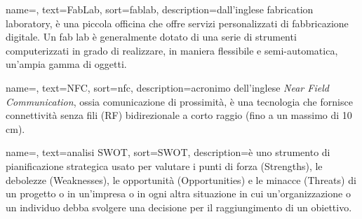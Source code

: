 {
	name=,
    text=FabLab,
    sort=fablab,
    description={dall'inglese fabrication laboratory, è una piccola officina che offre servizi personalizzati di fabbricazione digitale. Un fab lab è generalmente dotato di una serie di strumenti computerizzati in grado di realizzare, in maniera flessibile e semi-automatica, un'ampia gamma di oggetti.}
}

{
	name=,
    text=NFC,
    sort=nfc,
    description={acronimo dell'inglese \textit{Near Field Communication}, ossia comunicazione di prossimità, è una tecnologia che fornisce connettività senza fili (RF) bidirezionale a corto raggio (fino a un massimo di 10 cm).}
}

{
	name=,
    text=analisi SWOT,
    sort=SWOT,
    description={è uno strumento di pianificazione strategica usato per valutare i punti di forza (Strengths), le debolezze (Weaknesses), le opportunità (Opportunities) e le minacce (Threats) di un progetto o in un'impresa o in ogni altra situazione in cui un'organizzazione o un individuo debba svolgere una decisione per il raggiungimento di un obiettivo.}
}


